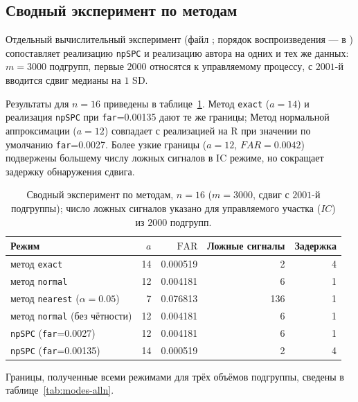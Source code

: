\documentclass[11pt,a4paper]{article}
\begin{document}
\subsection{Сводный эксперимент по методам}
\label{subsec:modes-exp}

Отдельный вычислительный эксперимент (файл ;
порядок воспроизведения --- в ) сопоставляет
реализацию \texttt{npSPC} и реализацию автора на одних и тех же данных: $m=3000$
подгрупп, первые $2000$ относятся к управляемому процессу, с $2001$-й
вводится сдвиг медианы на $1$ SD.

Результаты для $n=16$ приведены в таблице~\ref{tab:modes-exp}. 
Метод \texttt{exact} ($a=14$) и реализация \texttt{npSPC} при \texttt{far}=0.00135
дают те же границы; Метод нормальной аппроксимации ($a=12$) 
совпадает с реализацией на R при значении по умолчанию
\texttt{far}=0.0027. Более узкие границы ($a=12$, $FAR=0.0042$) подвержены большему числу
ложных сигналов в IC режиме, но сокращает задержку обнаружения сдвига.

\begin{table}[htbp]\centering
\caption{Сводный эксперимент по методам, $n=16$ ($m=3000$, сдвиг с $2001$-й подгруппы); 
число ложных сигналов указано для управляемого участка ($IC$) из $2000$ подгрупп.}
\label{tab:modes-exp}
\small
\begin{tabular}{@{}l r r r r@{}}
\toprule
Режим & $a$ & $\mathrm{FAR}$ & Ложные сигналы & Задержка \\
\midrule
метод \texttt{exact}                    & 14 & 0.000519 &   2 & 4 \\
метод \texttt{normal}                   & 12 & 0.004181 &   6 & 1 \\
метод \texttt{nearest} ($\alpha=0.05$)  &  7 & 0.076813 & 136 & 1 \\
метод \texttt{normal} (без чётности)    & 12 & 0.004181 &   6 & 1 \\
\texttt{npSPC} (\texttt{far}=0.0027)    & 12 & 0.004181 &   6 & 1 \\
\texttt{npSPC} (\texttt{far}=0.00135)   & 14 & 0.000519 &   2 & 4 \\
\bottomrule
\end{tabular}
\end{table}

Границы, полученные всеми режимами для трёх объёмов подгруппы, сведены в
таблице~\ref{tab:modes-alln}.
\end{document}
